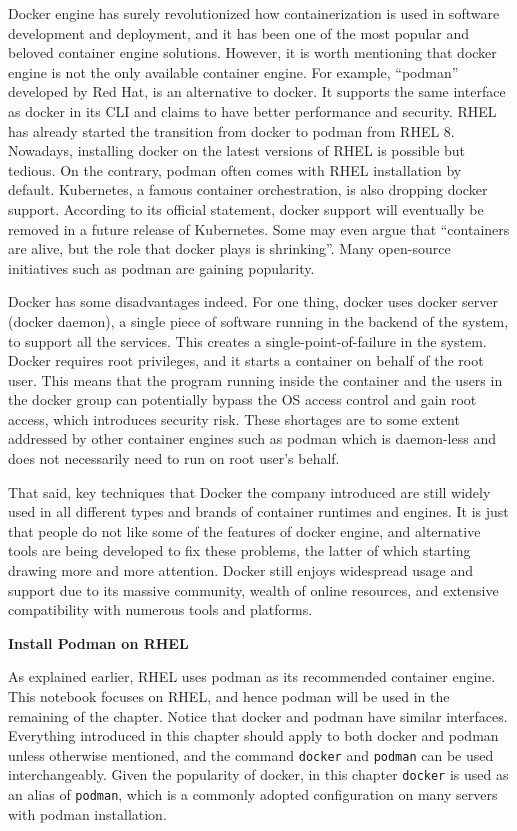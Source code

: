 Docker engine has surely revolutionized how containerization is used in software development and deployment, and it has been one of the most popular and beloved container engine solutions. However, it is worth mentioning that docker engine is not the only available container engine. For example, ``podman'' developed by Red Hat, is an alternative to docker. It supports the same interface as docker in its CLI and claims to have better performance and security. RHEL has already started the transition from docker to podman from RHEL 8. Nowadays, installing docker on the latest versions of RHEL is possible but tedious. On the contrary, podman often comes with RHEL installation by default. Kubernetes, a famous container orchestration, is also dropping docker support. According to its official statement, docker support will eventually be removed in a future release of Kubernetes. Some may even argue that ``containers are alive, but the role that docker plays is shrinking''. Many open-source initiatives such as podman are gaining popularity.

Docker has some disadvantages indeed. For one thing, docker uses docker server (docker daemon), a single piece of software running in the backend of the system, to support all the services. This creates a single-point-of-failure in the system. Docker requires root privileges, and it starts a container on behalf of the root user. This means that the program running inside the container and the users in the docker group can potentially bypass the OS access control and gain root access, which introduces security risk. These shortages are to some extent addressed by other container engines such as podman which is daemon-less and does not necessarily need to run on root user's behalf.

That said, key techniques that Docker the company introduced are still widely used in all different types and brands of container runtimes and engines. It is just that people do not like some of the features of docker engine, and alternative tools are being developed to fix these problems, the latter of which starting drawing more and more attention. Docker still enjoys widespread usage and support due to its massive community, wealth of online resources, and extensive compatibility with numerous tools and platforms. 

\vspace{0.1in}
\noindent \textbf{Install Podman on RHEL}
\vspace{0.1in}

As explained earlier, RHEL uses podman as its recommended container engine. This notebook focuses on RHEL, and hence podman will be used in the remaining of the chapter. Notice that docker and podman have similar interfaces. Everything introduced in this chapter should apply to both docker and podman unless otherwise mentioned, and the command \verb|docker| and \verb|podman| can be used interchangeably. Given the popularity of docker, in this chapter \verb|docker| is used as an alias of \verb|podman|, which is a commonly adopted configuration on many servers with podman installation.

